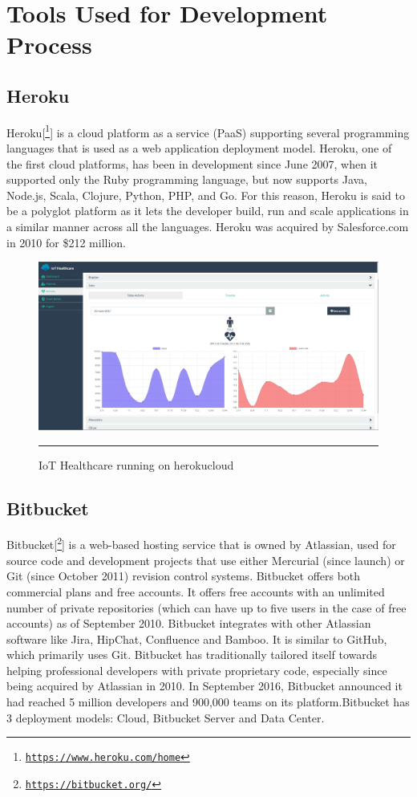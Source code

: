 \section{Tools Used for Development Process}
\subsection{Heroku}
Heroku[\footnote{\href{https://www.heroku.com/home}{\texttt{https://www.heroku.com/home}}}] is a cloud platform as a service (PaaS) supporting several programming languages that is used as a web application deployment model. Heroku, one of the first cloud platforms, has been in development since June 2007, when it supported only the Ruby programming language, but now supports Java, Node.js, Scala, Clojure, Python, PHP, and Go. For this reason, Heroku is said to be a polyglot platform as it lets the developer build, run and scale applications in a similar manner across all the languages. Heroku was acquired by Salesforce.com in 2010 for \$212 million.
\begin{figure}[h!]
	\centering
	\includegraphics[width=1\textwidth]{./images/iothheroku}
	\rule{1\textwidth}{1pt}
	\caption{IoT Healthcare running on herokucloud}
	\label{fig:iothoh}
\end{figure}
\subsection{Bitbucket}
Bitbucket[\footnote{\href{https://bitbucket.org/}{\texttt{https://bitbucket.org/}}}] is a web-based hosting service that is owned by Atlassian, used for source code and development projects that use either Mercurial (since launch) or Git (since October 2011) revision control systems. Bitbucket offers both commercial plans and free accounts. It offers free accounts with an unlimited number of private repositories (which can have up to five users in the case of free accounts) as of September 2010. Bitbucket integrates with other Atlassian software like Jira, HipChat, Confluence and Bamboo.
It is similar to GitHub, which primarily uses Git. Bitbucket has traditionally tailored itself towards helping professional developers with private proprietary code, especially since being acquired by Atlassian in 2010. In September 2016, Bitbucket announced it had reached 5 million developers and 900,000 teams on its platform.Bitbucket has 3 deployment models: Cloud, Bitbucket Server and Data Center.
